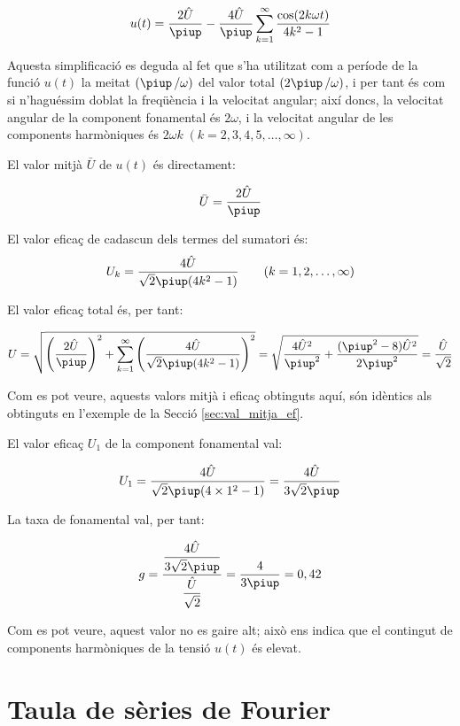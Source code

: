\begin{exemple}
    \[
    u(t) = \frac{2\hat{U}}{\piup} - \frac{4\hat{U}}{\piup} \sum_{k=1}^\infty
          \frac{\cos(2 k \omega t)}{4k^2-1}
    \]

    Aquesta simplificació es deguda al fet que s'ha utilitzat com a
    període de la funció $u(t)$ la meitat $(\piup\,/\omega)$ del valor total
    $(2\piup\,/\omega)$, i per tant és com si n'haguéssim doblat la
    freqüència i la velocitat angular; així doncs, la velocitat angular
    de la component fonamental és $2\omega$, i la velocitat angular de
    les components harmòniques és $2\omega k \;(k=2,3,4,5,\ldots,\infty)$.

    El valor mitjà $\bar{U}$ de $u(t)$ és directament:

    \[
        \bar{U} = \frac{2\hat{U}}{\piup}
    \]

    El valor eficaç de cadascun dels termes del sumatori és:
    \[
        U_k =\frac{4\hat{U}}{\sqrt{2}\piup(4k^2-1)}
        \qquad(k=1,2,\ldots,\infty)
    \]

    El valor eficaç total és, per tant:

    \[
        U=\sqrt{\left(\frac{2\hat{U}}{\piup}\right)^2 + \sum_{k=1}^\infty
        \left(\frac{4\hat{U}}{\sqrt{2}\piup(4k^2-1)}\right)^2} =
        \sqrt{\frac{4\hat{U}^2}{\piup^2} + \frac{(\piup^2-8)\hat{U}^2}{2\piup^2}
        }= \frac{\hat{U}}{\sqrt{2}}
    \]

    Com es pot veure, aquests valors mitjà i eficaç obtinguts aquí, són
    idèntics als obtinguts en l'exemple de la Secció
    \ref{sec:val_mitja_ef}.

    El valor eficaç $U_1$ de la component fonamental val:

    \[
        U_1 =\frac{4\hat{U}}{\sqrt{2}\piup(4\times 1^2-1)} =
        \frac{4\hat{U}}{3\sqrt{2}\piup}
    \]

    La taxa de fonamental val, per tant:

    \[
        g =
        \frac{\dfrac{4\hat{U}}{3\sqrt{2}\piup}}{\dfrac{\hat{U}}{\sqrt{2}}}
        =\frac{4}{3\piup} = 0,{42}
    \]

    Com es pot veure, aquest valor no es gaire alt; això ens indica que
    el contingut de components harmòniques de la tensió $u(t)$ és
    elevat.
\end{exemple}


\section{Taula de sèries de Fourier}

